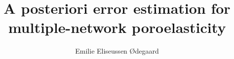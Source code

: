 \documentclass[a4paper, 11.5pt]{memoir}
\title{A posteriori error estimation for multiple-network poroelasticity}
\author{Emilie Eliseussen Ødegaard}
\begin{document}
	\masterfrontpage
    \frontmatter        %
	
	
	
    \tableofcontents    %

    \mainmatter         %

	
	
	
	
	
	

    \backmatter         %
    \printbibliography
\end{document}
